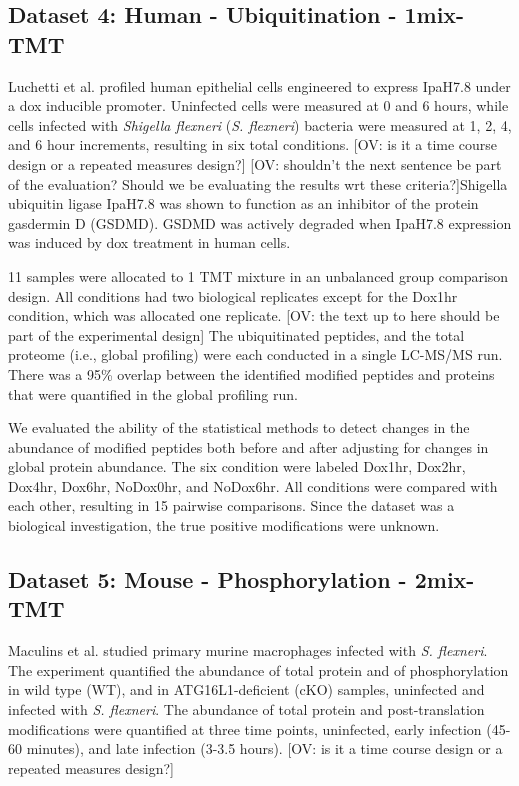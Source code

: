 \documentclass[mcp]{article}
\numberwithin{table}{section}
\def\todo#1{{\color{red}[#1]}}
\begin{document}
\subsection*{Dataset 4: Human - Ubiquitination - 1mix-TMT}
\label{sec:exp_proc_dataset4}

\medskip {}  Luchetti et al. \cite{LUCHETTI2021} profiled human epithelial cells engineered to express IpaH7.8 under a dox inducible promoter. Uninfected cells were measured at 0 and 6 hours, while cells infected with {\it Shigella flexneri} ({\it S. flexneri}) bacteria were measured at 1, 2, 4, and 6 hour increments, resulting in six total conditions. \todo{OV: is it a time course design or a repeated measures design?} \todo{OV: shouldn't the next sentence be part of the evaluation? Should we be evaluating the results wrt these criteria?}Shigella ubiquitin ligase IpaH7.8 was shown to function as an inhibitor of the protein gasdermin D (GSDMD). GSDMD was actively degraded when IpaH7.8 expression was induced by dox treatment in human cells.

\medskip {} 11 samples were allocated to 1 TMT mixture in an unbalanced group comparison design. All conditions had two biological replicates except for the Dox1hr condition, which was allocated one replicate. \todo{OV: the text up to here should be part of the experimental design} The ubiquitinated peptides, and the total proteome (i.e., global profiling) were each conducted in a single LC-MS/MS run. There was a 95\% overlap between the identified modified peptides and proteins that were quantified in the global profiling run.

\medskip {} We evaluated the ability of the statistical methods to detect changes in the abundance of modified peptides both before and after adjusting for changes in global protein abundance. The six condition were labeled Dox1hr, Dox2hr, Dox4hr, Dox6hr, NoDox0hr, and NoDox6hr. All conditions were compared with each other, resulting in 15 pairwise comparisons. Since the dataset was a biological investigation, the true positive modifications were unknown.


\subsection*{Dataset 5: Mouse - Phosphorylation - 2mix-TMT}
\label{sec:exp_proc_dataset5}


\medskip {} Maculins et al. \cite{Maculins} studied primary murine macrophages infected with {\it S. flexneri}. The experiment quantified the abundance of total protein and of phosphorylation in wild type (WT), and in ATG16L1-deficient (cKO) samples, uninfected and infected with {\it S. flexneri}. The abundance of total protein and post-translation modifications were quantified at three time points, uninfected, early infection (45-60 minutes), and late infection (3-3.5 hours). \todo{OV: is it a time course design or a repeated measures design?}
\end{document}
